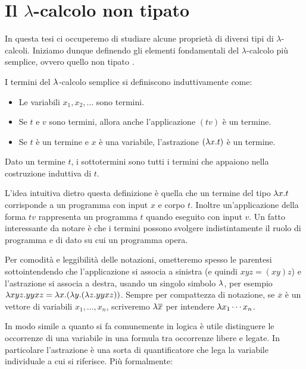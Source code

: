 \documentclass[]{marticle}
\begin{document}
\section{Il $\lambda$-calcolo non tipato}

In questa tesi ci occuperemo di studiare alcune propriet\`a di diversi tipi
di $\lambda$-calcoli. Iniziamo dunque definendo gli elementi fondamentali del
$\lambda$-calcolo pi\`u semplice, ovvero quello non tipato \cite{baren}.

\begin{block}[Definizione]
    I termini del $\lambda$-calcolo semplice si definiscono induttivamente come:
    \begin{itemize}
        \item Le variabili $x_1, x_2, \dots$ sono termini.
        \item Se $t$ e $v$ sono termini, allora anche l'applicazione $(tv)$ \`e
            un termine.
        \item Se $t$ \`e un termine e $x$ \`e una variabile, l'astrazione $(\lambda
            x.  t)$ \`e un termine.
    \end{itemize}

    Dato un termine $t$, i sottotermini sono tutti i termini che appaiono nella
    costruzione induttiva di $t$.
\end{block}

L'idea intuitiva dietro questa definizione \`e quella che un termine del tipo
$\lambda x.t$ corrisponde a un programma con input $x$ e corpo $t$. Inoltre
un'applicazione della forma $tv$ rappresenta  un programma $t$ quando eseguito
con input $v$. Un fatto interessante da notare \`e che i termini possono
svolgere indistintamente il ruolo di programma e di dato su cui un programma
opera.

Per comodit\`a e leggibilit\`a delle notazioni, ometteremo spesso le parentesi
sottointendendo che l'applicazione si associa a sinistra (e quindi $xyz=(xy)z$)
e l'astrazione si associa a destra, usando un singolo simbolo $\lambda$, per esempio
$\lambda xyz.yyxz = \lambda x. (\lambda y. (\lambda z. yyxz))$. Sempre per compattezza di notazione,
se $\overline{x}$ \`e un vettore di variabili $x_1,\dots,x_n$, scriveremo $\lambda
\overline{x}$ per intendere $\lambda x_1\cdots x_n$.

In modo simile a quanto si fa comunemente in logica \`e utile distinguere le
occorrenze di una variabile in una formula tra occorrenze libere e legate. In
particolare l'astrazione \`e una sorta di quantificatore che lega la variabile
individuale a cui si riferisce. Pi\`u formalmente:
\end{document}
